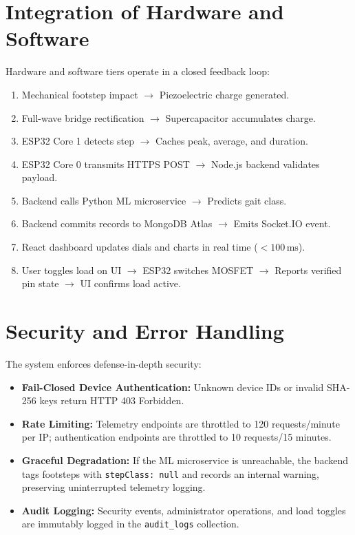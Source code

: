 \section{Integration of Hardware and Software}
Hardware and software tiers operate in a closed feedback loop:
\begin{enumerate}
    \item Mechanical footstep impact $\rightarrow$ Piezoelectric charge generated.
    \item Full-wave bridge rectification $\rightarrow$ Supercapacitor accumulates charge.
    \item ESP32 Core 1 detects step $\rightarrow$ Caches peak, average, and duration.
    \item ESP32 Core 0 transmits HTTPS POST $\rightarrow$ Node.js backend validates payload.
    \item Backend calls Python ML microservice $\rightarrow$ Predicts gait class.
    \item Backend commits records to MongoDB Atlas $\rightarrow$ Emits Socket.IO event.
    \item React dashboard updates dials and charts in real time ($<100\,\text{ms}$).
    \item User toggles load on UI $\rightarrow$ ESP32 switches MOSFET $\rightarrow$ Reports verified pin state $\rightarrow$ UI confirms load active.
\end{enumerate}

\section{Security and Error Handling}
The system enforces defense-in-depth security:
\begin{itemize}
    \item \textbf{Fail-Closed Device Authentication:} Unknown device IDs or invalid SHA-256 keys return HTTP 403 Forbidden.
    \item \textbf{Rate Limiting:} Telemetry endpoints are throttled to 120 requests/minute per IP; authentication endpoints are throttled to 10 requests/15 minutes.
    \item \textbf{Graceful Degradation:} If the ML microservice is unreachable, the backend tags footsteps with \texttt{stepClass: null} and records an internal warning, preserving uninterrupted telemetry logging.
    \item \textbf{Audit Logging:} Security events, administrator operations, and load toggles are immutably logged in the \texttt{audit\_logs} collection.
\end{itemize}
